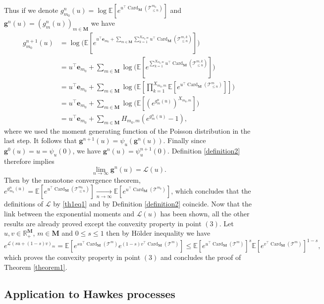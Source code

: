 \documentclass[reqno,final,11pt]{amsart}
\theoremstyle{plain}
\theoremstyle{definition}
\theoremstyle{remark}
\newcommand{\R}{\mathds{R}}
\newcommand{\E}[1]{\mathds{E}\left[#1\right]}
\newcommand{\M}{\bm{M}}
\newcommand{\T}{\mathcal{T}}
\renewcommand{\L}{\bm{\mathscr{L}}}
\newcommand{\e}{\bm{e}}
\newcommand{\pos}{\R_+^{\M}}
\newcommand{\trp}{^{\intercal}}
\DeclareMathOperator{\card}{Card}
\begin{document}
Thus if we denote $g^n_{m_0}(u) = \log \E{e^{u\trp \card_{\M}(\T^{m_0}_{\leq n})}}$ and $\bm{g}^n(u) = (g^n_m(u))_{m\in\M}$ we have
\begin{align*}
    g^{n+1}_{m_0}(u) & = \log \Big(  \E{e^{u\trp \e_{m_0} + \sum_{m\in\M} \sum_{k=1}^{X_{m_0,m}} u\trp \card_{\M}(\T^{m,k}_{\leq n})}} \Big)\\
    & = u \trp \e_{m_0} + \sum_{m\in\M} \log \Big(  \E{e^{\sum_{k=1}^{X_{m_0,m}} u\trp \card_{\M}(\T^{m,k}_{\leq n})}} \Big) \\
    & = u \trp \e_{m_0} + \sum_{m\in\M} \log \bigg(  \E{\prod_{k=1}^{X_{m_0,m}} \E{e^{u\trp \card_{\M}(\T^{m}_{\leq n})}} }\bigg) \\
    & = u \trp \e_{m_0} + \sum_{m\in\M} \log \Big(  \E{(e^{g^n_m(u)})^{X_{m_0,m}} }\Big) \\
    & = u \trp \e_{m_0} + \sum_{m\in\M}  H_{m_0,m} (e^{g^n_m(u)}-1),
\end{align*}
where we used the moment generating function of the Poisson distribution in the last step. It follows that $\bm{g}^{n+1}(u) = \psi_{u}(\bm{g}^n(u))$. Finally since $\bm{g}^{0}(u) = u = \psi_{u}(0)$, we have $\bm{g}^{n}(u) = \psi_{u}^{n+1}(0)$. Definition \ref{definition2} therefore implies 
\begin{equation*}
    \lim\limits_{n\to\infty} \bm{g}^n(u) = \L(u).
\end{equation*}
Then by the monotone convergence theorem, $e^{g^n_{m_0}(u)} = \E{e^{u \trp \card_{\M}(\T^{m_0}_{\leq n})}} \xrightarrow[n\to\infty]{} \E{e^{u \trp \card_{\M}(\T^{m_0})}}$, which concludes that the definitions of $\L$ by \eqref{th1eq1} and by Definition \ref{definition2} coincide. Now that the link between the exponential moments and $\L(u)$ has been shown, all the other results are already proved except the convexity property in point $(3)$. Let $u,v\in\pos$, $m\in\M$ and $0\leq s \leq 1$ then by Hölder inequality we have
\begin{equation*}
	e^{\L(su+(1-s)v)_m} = \E{e^{su\trp \card_{\M}(\T^m)}e^{(1-s)v\trp \card_{\M}(\T^m)}} \leq \E{e^{u\trp \card_{\M}(\T^m)}}^s \E{e^{v\trp \card_{\M}(\T^m)}}^{1-s},
\end{equation*}
which proves the convexity property in point $(3)$ and concludes the proof of Theorem \ref{theorem1}.

\subsection{Application to Hawkes processes}\label{section3.3}
\end{document}
